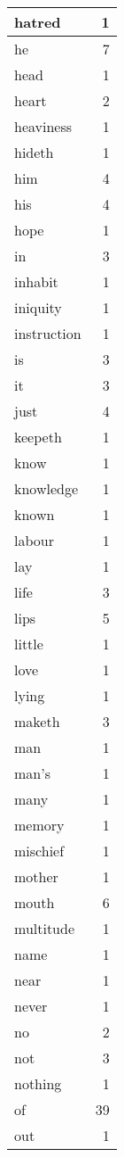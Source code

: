 \begin{center}
\begin{longtable}{l|r}
hatred & 1\\ \hline 
he & 7\\ \hline 
head & 1\\ \hline 
heart & 2\\ \hline 
heaviness & 1\\ \hline 
hideth & 1\\ \hline 
him & 4\\ \hline 
his & 4\\ \hline 
hope & 1\\ \hline 
in & 3\\ \hline 
inhabit & 1\\ \hline 
iniquity & 1\\ \hline 
instruction & 1\\ \hline 
is & 3\\ \hline 
it & 3\\ \hline 
just & 4\\ \hline 
keepeth & 1\\ \hline 
know & 1\\ \hline 
knowledge & 1\\ \hline 
known & 1\\ \hline 
labour & 1\\ \hline 
lay & 1\\ \hline 
life & 3\\ \hline 
lips & 5\\ \hline 
little & 1\\ \hline 
love & 1\\ \hline 
lying & 1\\ \hline 
maketh & 3\\ \hline 
man & 1\\ \hline 
man's & 1\\ \hline 
many & 1\\ \hline 
memory & 1\\ \hline 
mischief & 1\\ \hline 
mother & 1\\ \hline 
mouth & 6\\ \hline 
multitude & 1\\ \hline 
name & 1\\ \hline 
near & 1\\ \hline 
never & 1\\ \hline 
no & 2\\ \hline 
not & 3\\ \hline 
nothing & 1\\ \hline 
of & 39\\ \hline 
out & 1\\ \hline 

\end{longtable}
\end{center}
